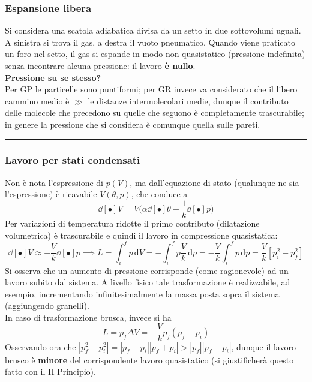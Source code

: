 \documentclass[10pt, oneside]{book}
\newcommand{\infobox}[2]{\vspace{0.5cm}~\\ \textbf{#1} \hrulefill \vspace{0.2cm}\\#2 \\\hrule \vspace{0.5cm}}
\newcommand{\ds}{\displaystyle}
\newcommand{\integral}[4]{\int_{#1}^{#2} #3 \, \mathrm{d}#4}
\begin{document}
\subsubsection*{Espansione libera}
Si considera una scatola adiabatica divisa da un setto in due sottovolumi uguali. A sinistra si trova il gas, a destra il vuoto pneumatico. Quando viene praticato un foro nel setto, il gas si espande in modo non quasistatico (pressione indefinita) senza incontrare alcuna pressione: il lavoro \textbf{è nullo}.
\infobox{Pressione su se stesso?}{Per GP le particelle sono puntiformi; per GR invece va considerato che il libero cammino medio è $\gg$ le distanze intermolecolari medie, dunque il contributo delle molecole che precedono su quelle che seguono è completamente trascurabile; in genere la pressione che si considera è comunque quella sulle pareti.}

\subsubsection*{Lavoro per stati condensati}
Non è nota l'espressione di $p(V)$, ma dall'equazione di stato (qualunque ne sia l'espressione) è ricavabile $V(\theta, p)$, che conduce a 
\[\dd[•]{V} = V \bigg(\alpha \dd[•]{\theta} - \frac{1}{k} \dd[•]{p}\bigg)\]
Per variazioni di temperatura ridotte il primo contributo (dilatazione volumetrica) è trascurabile e quindi il lavoro in compressione quasistatica:
\[\dd[•]{V} \approx - \frac{V}{k} \dd[•]{p} \implies L = \integral{i}{f}{p}{V} = - \integral{i}{f}{p \frac{V}{k}}{p} = - \frac{V}{k} \integral{i}{f}{p}{p} = \frac{V}{k} [p_i^2 - p_f^2]\]
Si osserva che un aumento di pressione corrisponde (come ragionevole) ad un lavoro subito dal sistema. A livello fisico tale trasformazione è realizzabile, ad esempio, incrementando infinitesimalmente la massa posta sopra il sistema (aggiungendo granelli).\\
In caso di trasformazione brusca, invece si ha
\[L = p_f \Delta V = -\frac{V}{k} p_f (p_f - p_i)\]
Osservando ora che $\ds |p_f^2 - p_i^2| = |p_f - p_i| |p_f + p_i| > |p_f| |p_f - p_i|$, dunque il lavoro brusco è \textbf{minore} del corrispondente lavoro quasistatico (si giustificherà questo fatto con il II Principio).
\end{document}
